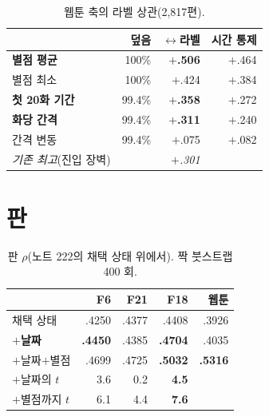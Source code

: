 \documentclass[10pt]{article}
\begin{document}
\begin{table}[t]
\centering\tsize
\caption{웹툰 축의 라벨 상관(2,817편).}
\begin{tabular}{lrrr}
\toprule
& 덮음 & $\leftrightarrow$라벨 & 시간 통제 \\
\midrule
\textbf{별점 평균} & 100\% & \textbf{$+$.506} & $+$.464 \\
별점 최소 & 100\% & $+$.424 & $+$.384 \\
\textbf{첫 20화 기간} & 99.4\% & \textbf{$+$.358} & $+$.272 \\
\textbf{화당 간격} & 99.4\% & \textbf{$+$.311} & $+$.240 \\
간격 변동 & 99.4\% & $+$.075 & $+$.082 \\
\midrule
\emph{기존 최고}(진입 장벽) & & \emph{$+$.301} & \\
\bottomrule
\end{tabular}
\end{table}


\section{판}

\begin{table}[t]
\centering\tsize
\caption{판 $\rho$(노트 222의 채택 상태 위에서). 짝 붓스트랩 400 회.}
\begin{tabular}{lrrrr}
\toprule
& F6 & F21 & F18 & 웹툰 \\
\midrule
채택 상태 & .4250 & .4377 & .4408 & .3926 \\
\textbf{$+$날짜} & \textbf{.4450} & .4385 & \textbf{.4704} & .4035 \\
$+$날짜$+$별점 & .4699 & .4725 & \textbf{.5032} & \textbf{.5316} \\
\midrule
$+$날짜의 $t$ & 3.6 & 0.2 & \textbf{4.5} & \\
$+$별점까지 $t$ & 6.1 & 4.4 & \textbf{7.6} & \\
\bottomrule
\end{tabular}
\end{table}

\end{document}

